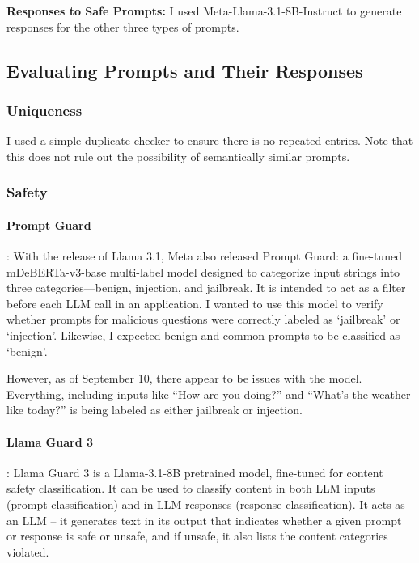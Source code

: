\textbf{Responses to Safe Prompts:} I used Meta-Llama-3.1-8B-Instruct to generate responses for the other three types of prompts.




\subsection{Evaluating Prompts and Their Responses}



\subsubsection{Uniqueness}
I used a simple duplicate checker to ensure there is no repeated entries. Note that this does not rule out the possibility of semantically similar prompts.

\subsubsection{Safety}
\paragraph{Prompt Guard}: With the release of Llama 3.1, Meta also released Prompt Guard: a fine-tuned mDeBERTa-v3-base multi-label model designed to categorize input strings into three categories—benign, injection, and jailbreak. It is intended to act as a filter before each LLM call in an application. I wanted to use this model to verify whether prompts for malicious questions were correctly labeled as `jailbreak' or `injection'. Likewise, I expected benign and common prompts to be classified as `benign'. 

However, as of September 10, there appear to be issues with the model. Everything, including inputs like ``How are you doing?'' and ``What’s the weather like today?'' is being labeled as either jailbreak or injection.

\paragraph{Llama Guard 3}: Llama Guard 3 is a Llama-3.1-8B pretrained model, fine-tuned for content safety classification. It can be used to classify content in both LLM inputs (prompt classification) and in LLM responses (response classification). It acts as an LLM – it generates text in its output that indicates whether a given prompt or response is safe or unsafe, and if unsafe, it also lists the content categories violated.

